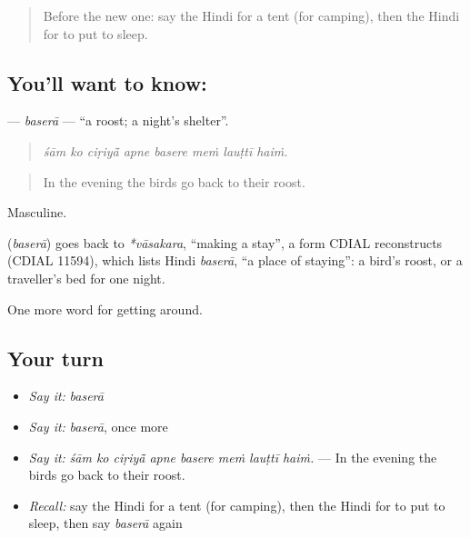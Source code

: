 \label{lesson:HI-C416-basera}



\begin{quote}
Before the new one: say the Hindi for a tent (for camping), then the Hindi for to put to sleep.
\end{quote}

\subsection*{You'll want to know: }
\textbf{} — \emph{baserā} — \textquotedblleft{}a roost; a night's shelter\textquotedblright{}.

\begin{quote}
       
\end{quote}

\begin{quote}
\emph{śām ko ciṛiyā̃ apne basere meṁ lauṭtī haiṁ.}
\end{quote}

\begin{quote}
In the evening the birds go back to their roost.
\end{quote}

Masculine.

\begin{cousinweb}
\textbf{} (\emph{baserā}) goes back to \emph{*vāsakara}, \textquotedblleft{}making a stay\textquotedblright{}, a form CDIAL reconstructs (CDIAL 11594), which lists Hindi \emph{baserā}, \textquotedblleft{}a place of staying\textquotedblright{}: a bird's roost, or a traveller's bed for one night.
\end{cousinweb}

\begin{grammarlens}[title={What you've built}]
One more word for getting around.
\end{grammarlens}

\subsection*{Your turn}
\begin{itemize}
\raggedright
  \item \emph{Say it:} \emph{baserā}
  \item \emph{Say it:} \emph{baserā}, once more
  \item \emph{Say it:} \emph{śām ko ciṛiyā̃ apne basere meṁ lauṭtī haiṁ.} — In the evening the birds go back to their roost.
  \item \emph{Recall:} say the Hindi for a tent (for camping), then the Hindi for to put to sleep, then say \emph{baserā} again
\end{itemize}

